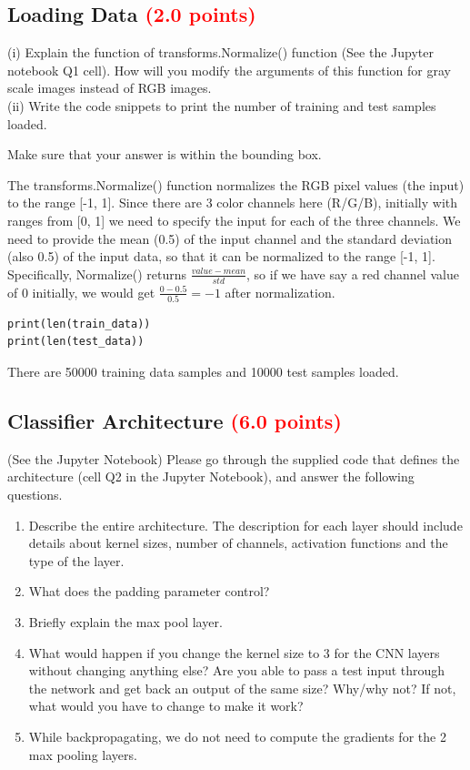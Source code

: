 \documentclass[answers]{exam}
\newcommand{\mypoints}[1]{\textcolor{red}{(#1 points)}}
\begin{document}
\subsection{Loading Data \mypoints{2.0}}
(i) Explain the function of transforms.Normalize() function (See the Jupyter notebook Q1 cell). How will you modify the arguments of this function for gray scale images instead of RGB images. \\
(ii) Write the code snippets to print the number of training and test samples loaded. 

Make sure that your answer is within the bounding box.
\begin{solution}
The transforms.Normalize() function normalizes the RGB pixel values (the input) to the range [-1, 1]. Since there are 3 color channels here (R/G/B), initially 
with ranges from [0, 1] we need to specify the input for each of the three channels. We need to provide the mean (0.5) of the input channel and the standard deviation (also 0.5) of the input data, so that it can be normalized to the range [-1, 1]. Specifically, Normalize() returns $\frac{value - mean}{std}$, so if we have say a red channel value of 0 initially, we would get $\frac{0 - 0.5}{0.5}=-1$ after
normalization.
\begin{verbatim}
print(len(train_data))
print(len(test_data))
\end{verbatim}
There are 50000 training data samples and 10000 test samples loaded.
\end{solution}

\subsection{Classifier Architecture \mypoints{6.0}}
(See the Jupyter Notebook) Please  go  through  the  supplied  code  that defines the architecture (cell Q2 in the Jupyter Notebook), and answer the following questions. 

\begin{enumerate}
\item Describe the entire architecture. The description for each layer should include details about kernel sizes, number of channels, activation functions and the type of the layer. 

\item What does the padding parameter control?

\item Briefly explain the max pool layer.

\item What would happen if you change the kernel size to 3 for the CNN layers without changing anything else? Are you able to pass a test input through the network and get back an output of the same size? Why/why not? If not, what would you have to change to make it work?

\item While backpropagating, we do not need to compute the gradients for the 2 max pooling layers.
\end{enumerate}
\end{document}
